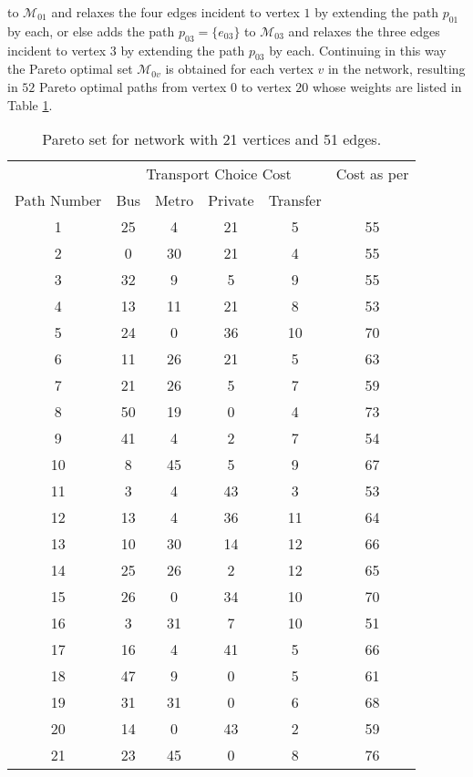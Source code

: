 \documentclass[preprint,authoryear,12pt]{elsarticle}
\begin{document}
to $\mathcal{M}_{01}$ and relaxes the four edges incident to vertex $1$ by extending the
path $p_{01}$ by each, or else adds the path $p_{03}=\{e_{03}\}$ to $\mathcal{M}_{03}$
and relaxes the three edges incident to vertex $3$ by extending the path $p_{03}$ by each.
Continuing in this way the Pareto optimal set $\mathcal{M}_{0v}$ is obtained for
each vertex $v$ in the network, resulting in $52$ Pareto optimal paths from vertex $0$
to vertex $20$ whose weights are listed in Table \ref{tab:a}.
\begin{table}
\caption{Pareto set for network with 21 vertices and 51
edges.}\label{tab:a} \vspace{-0.1 cm}
\begin{center}\begin{scriptsize}
\begin{tabular}{|c|cccc|c|}\hline
    & \multicolumn{4}{c|}{Transport Choice Cost}& Cost as per\\ \cline{2-5}
Path Number & Bus & Metro & Private & Transfer & {\tiny{\cite{Lozano2001}}}\\ \hline
  1 & 25 & 4  & 21 & 5  & 55 \\
  2 & 0  & 30 & 21 & 4  & 55 \\
  3 & 32 & 9  & 5  & 9  & 55 \\
  4 & 13 & 11 & 21 & 8  & 53 \\
  5 & 24 & 0  & 36 & 10 & 70 \\
  6 & 11 & 26 & 21 & 5  & 63 \\
  7 & 21 & 26 & 5  & 7  & 59 \\
  8 & 50 & 19 & 0  & 4  & 73 \\
  9 & 41 & 4  & 2  & 7  & 54 \\
 10 & 8  & 45 & 5  & 9  & 67 \\
 11 & 3  & 4  & 43 & 3  & 53 \\
 12 & 13 & 4  & 36 & 11 & 64 \\
 13 & 10 & 30 & 14 & 12 & 66 \\
 14 & 25 & 26 & 2  & 12 & 65 \\
 15 & 26 & 0  & 34 & 10 & 70 \\
 16 & 3  & 31 & 7  & 10 & 51 \\
 17 & 16 & 4  & 41 & 5  & 66 \\
 18 & 47 & 9  & 0  & 5  & 61 \\
 19 & 31 & 31 & 0  & 6  & 68 \\
 20 & 14 & 0  & 43 & 2  & 59 \\
 21 & 23 & 45 & 0  & 8  & 76 \\

\end{tabular}
\end{scriptsize}
\end{center}
\end{table}
\end{document}
